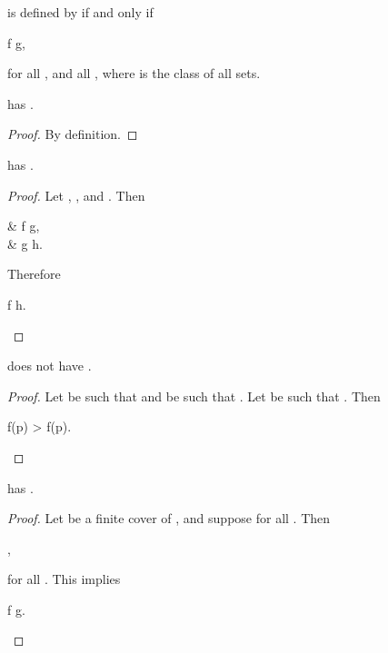 \documentclass[b5paper, english, oneside]{memoir}
\begin{document}
\begin{definition}
  is defined by  if and only if
\begin{eqs}
f \leq g,
\end{eqs}
for all , and all , where  is the class of all sets.
\end{definition}

\begin{theorem}
\label{ElementwiseOrder}
 has .
\end{theorem}

\begin{proof}
By definition. 
\end{proof}

\begin{theorem}
\label{ElementwiseTransivity}
 has .
\end{theorem}

\begin{proof}
Let , , and . Then
\begin{eqs}
{} & f \leq g, \\
{} & g \leq h.
\end{eqs}
Therefore
\begin{eqs}
f \leq h.
\end{eqs}
\end{proof}

\begin{theorem}
\label{ElementwiseScaleInvarianceFails}
 does not have .
\end{theorem}

\begin{proof}
Let  be such that  and  be such that . Let  be such that . Then
\begin{eqs}
f(p) > \alpha f(p).
\end{eqs}
\end{proof}

\begin{theorem}
\label{ElementwiseLocality}
 has .
\end{theorem}

\begin{proof}
Let  be a finite cover of , and suppose  for all . Then
\begin{eqs}
 \leq {},
\end{eqs}
for all . This implies
\begin{eqs}
f \leq g.
\end{eqs}
\end{proof}
\end{document}

